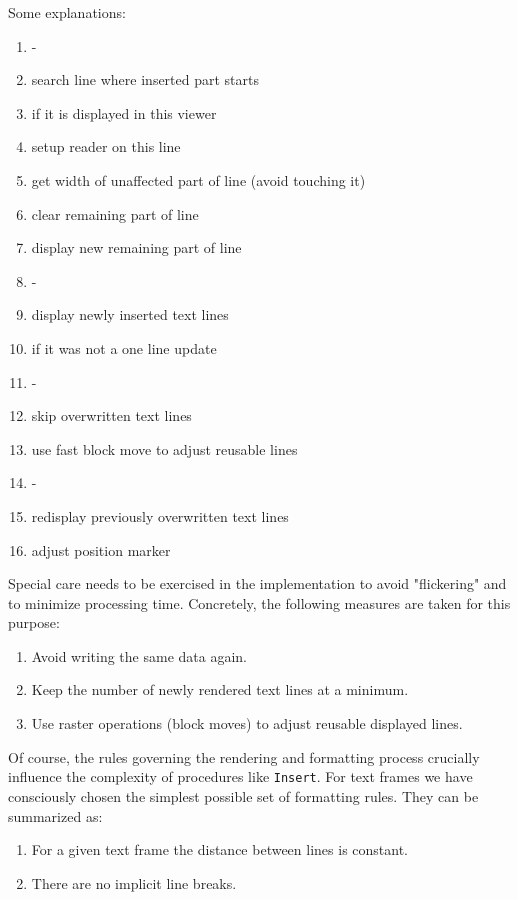 Some explanations:
\begin{enumerate}
  \item -
  \item search line where inserted part starts
  \item if it is displayed in this viewer
  \item setup reader on this line
  \item get width of unaffected part of line (avoid touching it)
  \item clear remaining part of line
  \item display new remaining part of line
  \item -
  \item display newly inserted text lines
  \item if it was not a one line update
  \item -
  \item skip overwritten text lines
  \item use fast block move to adjust reusable lines
  \item -
  \item redisplay previously overwritten text lines
  \item adjust position marker
\end{enumerate}

Special care needs to be exercised in the implementation to avoid "flickering" and to minimize
processing time. Concretely, the following measures are taken for this purpose:
\begin{enumerate}
  \item Avoid writing the same data again.
  \item Keep the number of newly rendered text lines at a minimum.
  \item Use raster operations (block moves) to adjust reusable displayed lines.
\end{enumerate}

Of course, the rules governing the rendering and formatting process crucially influence the
complexity of procedures like \verb|Insert|. For text frames we have consciously chosen the simplest
possible set of formatting rules. They can be summarized as:
\begin{enumerate}
  \item For a given text frame the distance between lines is constant.
  \item There are no implicit line breaks.
\end{enumerate}

